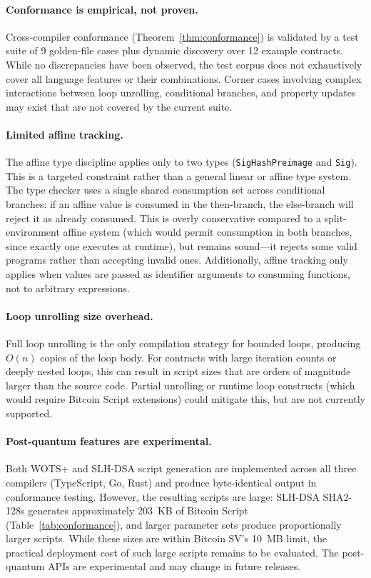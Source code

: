 \documentclass[11pt,a4paper]{article}
\begin{document}
\paragraph{Conformance is empirical, not proven.}
Cross-compiler conformance (Theorem~\ref{thm:conformance}) is validated
by a test suite of 9 golden-file cases plus dynamic discovery over 12
example contracts. While no discrepancies have been observed, the test
corpus does not exhaustively cover all language features or their
combinations. Corner cases involving complex interactions between loop
unrolling, conditional branches, and property updates may exist that
are not covered by the current suite.

\paragraph{Limited affine tracking.}
The affine type discipline applies only to two types
(\texttt{SigHashPreimage} and \texttt{Sig}). This is a targeted
constraint rather than a general linear or affine type system. The
type checker uses a single shared consumption set across conditional
branches: if an affine value is consumed in the then-branch, the
else-branch will reject it as already consumed. This is overly
conservative compared to a split-environment affine system (which would
permit consumption in both branches, since exactly one executes at
runtime), but remains sound---it rejects some valid programs rather than
accepting invalid ones. Additionally, affine tracking only applies when
values are passed as identifier arguments to consuming functions, not
to arbitrary expressions.

\paragraph{Loop unrolling size overhead.}
Full loop unrolling is the only compilation strategy for bounded loops,
producing $O(n)$ copies of the loop body. For contracts with large
iteration counts or deeply nested loops, this can result in script sizes
that are orders of magnitude larger than the source code. Partial
unrolling or runtime loop constructs (which would require Bitcoin Script
extensions) could mitigate this, but are not currently supported.

\paragraph{Post-quantum features are experimental.}
Both WOTS+ and SLH-DSA script generation are implemented across all three
compilers (TypeScript, Go, Rust) and produce byte-identical output in
conformance testing. However, the resulting scripts are large:
SLH-DSA SHA2-128s generates approximately 203~KB of Bitcoin Script
(Table~\ref{tab:conformance}), and larger parameter sets produce
proportionally larger scripts. While these sizes are within Bitcoin SV's
10~MB limit, the practical deployment cost of such large scripts remains
to be evaluated. The post-quantum APIs are experimental and may change in
future releases.
\end{document}
